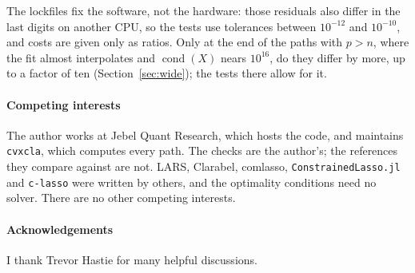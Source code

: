 \documentclass[11pt]{article}
\theoremstyle{remark}
\begin{document}
The lockfiles fix the software, not the hardware: those residuals also differ in the
last digits on another CPU, so the tests use tolerances between $10^{-12}$ and
$10^{-10}$, and costs are given only as ratios. Only at the end of the paths with $p>n$,
where the fit almost interpolates and $\operatorname{cond}(X)$ nears $10^{16}$, do they
differ by more, up to a factor of ten (Section~\ref{sec:wide}); the tests there allow
for it.

\paragraph{Competing interests}

The author works at Jebel Quant Research, which hosts the code, and maintains
\texttt{cvxcla}, which computes every path. The checks are the author's; the references
they compare against are not. LARS, Clarabel, comlasso, \texttt{ConstrainedLasso.jl} and
\texttt{c-lasso} were written by others, and the optimality conditions need no solver.
There are no other competing interests.

\paragraph{Acknowledgements}

I thank Trevor Hastie for many helpful discussions.
\end{document}
